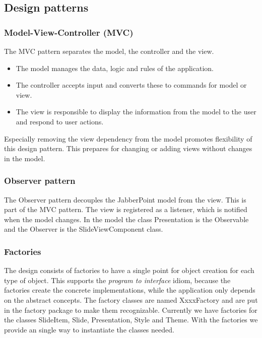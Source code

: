 \documentclass[a4paper]{article}
\begin{document}
\subsection{Design patterns}
\subsubsection{Model-View-Controller (MVC)}
The MVC pattern separates the model, the controller and the view.   
\begin{itemize}
\item The model manages the data, logic and rules of the application.
\item The controller accepts input and converts these to commands for model or view.
\item The view is responsible to display the information from the model to the user and respond to user actions.   
\end{itemize}
Especially removing the view dependency from the model promotes flexibility of this design pattern. This prepares for changing or adding views without changes in the model.

\subsubsection{Observer pattern}
The Observer pattern decouples the JabberPoint model from the view. This is part of the MVC pattern. The view is registered as a listener, which is notified when the model changes. In the model the class Presentation is the Observable and the Observer is the SlideViewComponent class.

\subsubsection{Factories}
The design consists of factories to have a single point for object creation for each type of object. This supports the \textit{program to interface} idiom, because the factories create the concrete implementations, while the application only depends on the abstract concepts. The factory classes are named XxxxFactory and are put in the factory package to make them recognizable.
Currently we have factories for the classes SlideItem, Slide, Presentation, Style and Theme. With the factories we provide an single way to instantiate the classes needed.
\end{document}
